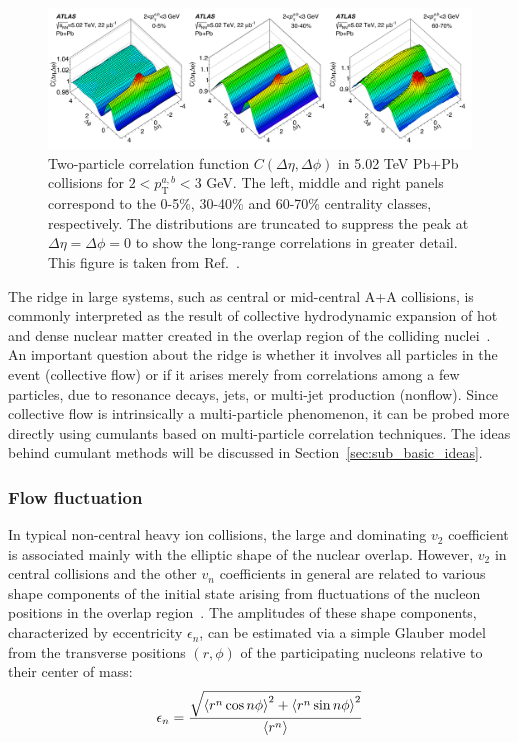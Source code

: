 \begin{figure}[H]
\centering
\includegraphics[width=.95\linewidth]{figs/chapter_subcumu/2pc.pdf}
\caption{Two-particle correlation function $C(\Delta\eta,\Delta\phi)$ in 5.02 TeV Pb+Pb collisions for $2<p_\text{T}^{a,b}<3$ GeV. The left, middle and right panels correspond to the 0-5\%, 30-40\% and 60-70\% centrality classes, respectively. The distributions are truncated to suppress the peak at $\Delta\eta=\Delta\phi=0$ to show the long-range correlations in greater detail. This figure is taken from Ref.~\cite{Aaboud:2018ves}.}
\label{fig:subcumu_2pc}
\end{figure}

The ridge in large systems, such as central or mid-central A+A collisions, is commonly interpreted as the result of collective hydrodynamic expansion of hot and dense nuclear matter created in the overlap region of the colliding nuclei~\cite{Abelev:2009af, ALICE:2011ab, ATLAS:2012at}. An important question about the ridge is whether it involves all particles in the event (collective flow) or if it arises merely from correlations among a few particles, due to resonance decays, jets, or multi-jet production (nonflow). Since collective flow is intrinsically a multi-particle phenomenon, it can be probed more directly using cumulants based on multi-particle correlation techniques. The ideas behind cumulant methods will be discussed in Section~\ref{sec:sub_basic_ideas}.



\subsubsection{Flow fluctuation}

In typical non-central heavy ion collisions, the large and dominating $v_2$ coefficient is associated mainly with the elliptic shape of the nuclear overlap. However, $v_2$ in central collisions and the other $v_n$ coefficients in general are related to various shape components of the initial state arising from fluctuations of the nucleon positions in the overlap region~\cite{Alver:2010gr}. The amplitudes of these shape components, characterized by eccentricity $\epsilon_n$, can be estimated via a simple Glauber model from the transverse positions $(r,\phi)$ of the participating nucleons relative to their center of mass:
\begin{equation}
\epsilon_n = \frac{\sqrt{\left\langle r^n \cos n\phi\right\rangle^2 + \left\langle r^n \sin n\phi\right\rangle^2}}{\left\langle r^n\right\rangle}
\end{equation}

